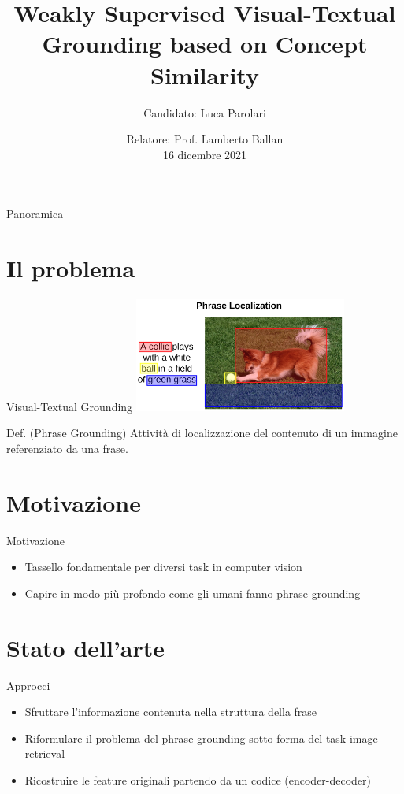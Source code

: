 \documentclass{beamer}
\title{Weakly Supervised Visual-Textual Grounding based on Concept Similarity}
\author{Candidato: Luca Parolari}
\date{Relatore: Prof. Lamberto Ballan \\ \vspace{0.2cm} \small 16 dicembre 2021}
\begin{document}
\maketitle

\begin{frame}{Panoramica}
  \tableofcontents
\end{frame}

\section{Il problema}

\begin{frame}{Visual-Textual Grounding}
  \centering
  \includegraphics[width=7cm]{images/dog-playing-with-ball.png}

  \vspace{0.5cm}

  \begin{alertblock}{Def. (Phrase Grounding)}
    Attività di localizzazione del contenuto di un immagine referenziato da una
    frase.
  \end{alertblock}
\end{frame}

\section{Motivazione}

\begin{frame}{Motivazione}
  \begin{itemize}
    \item Tassello fondamentale per diversi task in computer vision
    \item Capire in modo più profondo come gli umani fanno phrase grounding
  \end{itemize}
\end{frame}

\section{Stato dell'arte}

\begin{frame}{Approcci}
  \begin{itemize}
    \item Sfruttare l'informazione contenuta nella \alert{struttura
    della frase}
    \item Riformulare il problema del phrase grounding sotto forma del
    task \alert{image retrieval}
    \item \alert{Ricostruire} le feature originali partendo da un
    codice (encoder-decoder)
  \end{itemize}
\end{frame}
\end{document}
